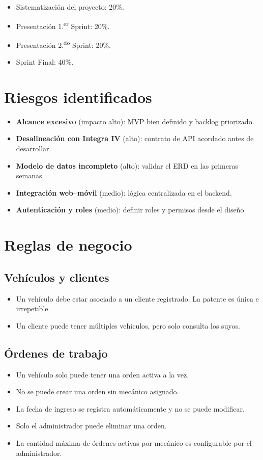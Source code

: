 \documentclass[11pt]{article}
\begin{document}
\begin{itemize}
  \item Sistematización del proyecto: 20\%.
  \item Presentación 1.\textsuperscript{er} Sprint: 20\%.
  \item Presentación 2.\textsuperscript{do} Sprint: 20\%.
  \item Sprint Final: 40\%.
\end{itemize}

\section{Riesgos identificados}

\begin{itemize}
  \item \textbf{Alcance excesivo} (impacto alto): MVP bien definido y backlog priorizado.
  \item \textbf{Desalineación con Integra IV} (alto): contrato de API acordado antes de desarrollar.
  \item \textbf{Modelo de datos incompleto} (alto): validar el ERD en las primeras semanas.
  \item \textbf{Integración web–móvil} (medio): lógica centralizada en el backend.
  \item \textbf{Autenticación y roles} (medio): definir roles y permisos desde el diseño.
\end{itemize}

\section{Reglas de negocio}

\subsection{Vehículos y clientes}
\begin{itemize}
  \item Un vehículo debe estar asociado a un cliente registrado. La patente es única e irrepetible.
  \item Un cliente puede tener múltiples vehículos, pero solo consulta los suyos.
\end{itemize}

\subsection{Órdenes de trabajo}
\begin{itemize}
  \item Un vehículo solo puede tener una orden activa a la vez.
  \item No se puede crear una orden sin mecánico asignado.
  \item La fecha de ingreso se registra automáticamente y no se puede modificar.
  \item Solo el administrador puede eliminar una orden.
  \item La cantidad máxima de órdenes activas por mecánico es configurable por el administrador.
\end{itemize}
\end{document}
